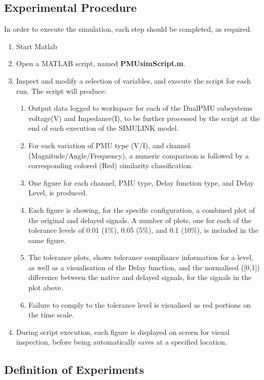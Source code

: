 \subsection{Experimental Procedure}
In order to execute the simulation, each step should be completed, as required.
\begin{enumerate}
    \item Start Matlab
    \item Open a MATLAB script, named \textbf{PMUsimScript.m}.
    \item Inspect and modify a selection of variables, and execute the script for each run. The script will produce:
    \begin{enumerate}
    \item Output data logged to workspace for each of the DualPMU subsystems voltage(V) and Impedance(I), to be further processed by the script at the end of each execution of the SIMULINK model.
    \item For each variation of PMU type (V/I), and channel (Magnitude/Angle/Frequency), a numeric comparison is followed by a corresponding colored (Red) similarity classification.
    \item One figure for each channel,  PMU type,  Delay function type, and Delay Level, is produced.
    \item Each figure is showing, for the specific configuration, a combined plot of the original and delayed signals. A number of plots, one for each of the tolerance levels of 0.01 (1\%), 0.05 (5\%), and 0.1 (10\%), is included in the same figure.
    \item The tolerance plots, shows  tolerance compliance information for a level, as well as a visualisation of the Delay function, and the normalised ([0,1]) difference between the native and delayed signals, for the signals in the plot above.
    \item Failure to comply to the tolerance level is visualised as red portions on the time scale.
    \end{enumerate}
    \item During script execution, each figure is displayed on screen for visual inspection, before being automatically saves at a specified location. 
\end{enumerate}
\subsection{Definition of Experiments} \label{sec:ExpDef}


